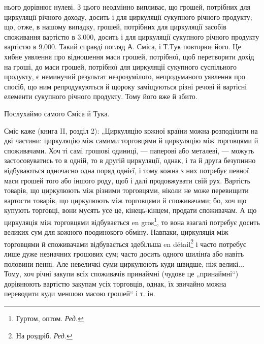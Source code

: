 \parcont{}  %
нього дорівнює нулеві. З цього неодмінно випливає, що грошей, потрібних
для циркуляції річного доходу, досить і для циркуляції сукупного
річного продукту; що, отже, в нашому випадку, грошей, потрібних для
циркуляції засобів споживання вартістю в 3.000, досить і для циркуляції
сукупного річного продукту вартістю в 9.000. Такий справді погляд
А. Сміса, і $Т. Т$ук повторює його. Це хибне уявлення про відношення
маси грошей, потрібної, щоб перетворити дохід на гроші, до маси грошей,
потрібної для циркуляції сукупного суспільного продукту, є неминучий
результат незрозумілого, непродуманого уявлення про спосіб, що
ним репродукуються й щороку заміщуються різні речові й вартісні елементи
сукупного річного продукту. Тому його вже й збито.

Послухаймо самого Сміса й Тука.

Сміс каже (книга II, розділ 2): „Циркуляцію кожної країни можна
розподілити на дві частини: циркуляцію між самими торговцями й циркуляцію
між торговцями й споживачами. Хоч ті самі грошові одиниці, — паперові
або металеві, — можуть застосовуватись то в одній, то в другій
циркуляції, однак, і та й друга безупинно відбуваються одночасно одна поряд
однієї, і тому кожна з них потребує певної маси грошей того або
іншого роду, щоб і далі продовжувати свій рух. Вартість товарів, що циркулюють
між різними торговцями, ніколи не може перевищити вартости
товарів, що циркулюють між торговцями й споживачами; бо, хоч що купують
торговці, вони мусять усе це, кінець-кінцем, продати споживачам.
А що циркуляція між торговцями відбувається en gros\footnote*{
Гуртом, оптом. \emph{Ред.}
}, то вона взагалі потребує
досить великих сум для кожного поодинокого обміну. Навпаки, циркуляція
між торговцями й споживачами відбувається здебільша en détail\footnote*{
На роздріб. \emph{Ред.}
}
і часто потребує лише дуже незначних грошових сум; часто досить одного
шилінґа або навіть половини пенні. Але невеличкі суми циркулюють
куди швидше, ніж великі... Тому, хоч річні закупи всіх споживачів принаймні
(чудове це „принаймні“) дорівнюють вартістю закупам усіх
торговців, однак, їх звичайно можна переводити куди меншою масою
грошей“ і т. ін.

